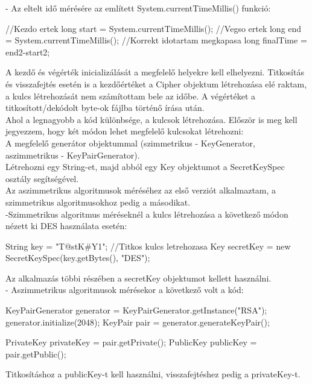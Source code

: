 \vspace{5pt}- Az eltelt idő mérésére az említett System.currentTimeMillis() funkció:
\begin{java}
//Kezdo ertek
long start = System.currentTimeMillis();
//Vegso ertek
long end = System.currentTimeMillis();	
//Korrekt idotartam megkapasa
long finalTime = end2-start2;	
\end{java}
A kezdő és végérték inicializálását a megfelelő helyekre kell elhelyezni. Titkosítás és visszafejtés esetén is a kezdőértéket a Cipher objektum létrehozása elé raktam, a kulcs létrehozását nem számítottam bele az időbe. A végértéket a titkosított/dekódolt byte-ok fájlba történő írása után.
\vspace{15pt} \\Ahol a legnagyobb a kód különbsége, a kulcsok létrehozása. Először is meg kell jegyezzem, hogy két módon lehet megfelelő kulcsokat létrehozni:
\vspace{5pt}\\ A megfelelő generátor objektummal (szimmetrikus - KeyGenerator, aszimmetrikus - KeyPairGenerator).
\vspace{5pt}\\ Létrehozni egy String-et, majd abból egy Key objektumot a SecretKeySpec osztály segítségével.
\vspace{5pt}\\Az aszimmetrikus algoritmusok méréséhez az első verziót alkalmaztam, a szimmetrikus algoritmusokhoz pedig a másodikat.
\vspace{5pt}\\ \noindent -Szimmetrikus algoritmus méréseknél a kulcs létrehozása a következő módon nézett ki DES használata esetén:
\begin{java}
String key = "T@stK#Y1";
//Titkos kulcs letrehozasa
Key secretKey = new SecretKeySpec(key.getBytes(), "DES");	
\end{java}
Az alkalmazás többi részében a secretKey objektumot kellett használni.
\vspace{7pt}\\- Aszimmetrikus algoritmusok mérésekor a következő volt a kód:
\begin{java}
KeyPairGenerator generator = 
			KeyPairGenerator.getInstance("RSA");
generator.initialize(2048);
KeyPair pair = generator.generateKeyPair();
	
PrivateKey privateKey = pair.getPrivate();
PublicKey publicKey = pair.getPublic();
\end{java}
Titkosításhoz a publicKey-t kell használni, visszafejtéshez pedig a privateKey-t.


